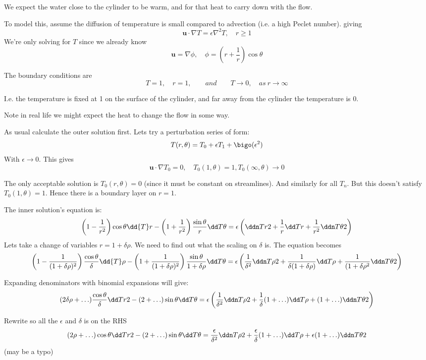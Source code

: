 \documentclass{X:/Documents/Coding/Latex/myassignment}
\begin{document}
We expect the water close to the cylinder to be warm, and for that heat to carry down with the flow.

To model this, assume the diffusion of temperature is small compared to advection (i.e. a high Peclet number). giving
\[\mathbf{u}\cdot \nabla T = \epsilon \nabla^2 T, \quad r \geq 1\]
We're only solving for $T$ since we already know
\[\mathbf{u} = \nabla\phi,\quad \phi = \left(r + \frac1r\right)\cos\theta\]

The boundary conditions are 
\[T=1,\quad r=1, \qquad and \qquad T\to 0,\quad as \ r\to \infty\]

I.e. the temperature is fixed at 1 on the surface of the cylinder, and far away from the cylinder the temperature is $0$.

Note in real life we might expect the heat to change the flow in some way.


As usual calculate the outer solution first.
Lets try a perturbation series of form:
\[T(r,\theta) = T_0 + \epsilon T_1 + \bigo(\epsilon^2)\]
With $\epsilon\to 0$. This gives
\[\mathbf{u} \cdot \nabla T_0 = 0 ,\quad T_0(1,\theta) = 1, T_0(\infty,\theta) \to 0\]

The only acceptable solution is $T_0(r,\theta) =0$ (since it must be constant on streamlines). And similarly for all $T_n$. But this doesn't satisfy $T_0(1,\theta)=1$. Hence there is a boundary layer on $r=1$.

The inner solution's equation is:
\[\left(1-\frac1{r^2}\right)\cos\theta \dd{T}r - \left(1 + \frac1{r^2}\right)\frac{\sin \theta}r \dd T\theta  = \epsilon\left(\ddn Tr2 + \frac1r \dd Tr + \frac1{r^2} \ddn T\theta 2\right)\]
Lets take a change of variables $r = 1 + \delta \rho$. We need to find out what the scaling on $\delta$ is.
The equation becomes
\begin{align*}
    \left(1-\frac1{(1 + \delta \rho)^2}\right)\frac{\cos\theta}\delta  \dd{T}\rho - \left(1 + \frac1{(1 + \delta \rho)^2}\right)\frac{\sin \theta}{1+\delta \rho} \dd T\theta  = \epsilon\left(\frac{1}{\delta^2}\ddn T\rho2 + \frac1{\delta(1+\delta \rho)} \dd T\rho + \frac1{(1+\delta \rho^2} \ddn T\theta 2\right)
\end{align*}

Expanding denominators with binomial expansions will give:
\[(2 \delta \rho + \hdots) \frac{\cos\theta}{\delta} \dd Tr2 - (2 +\hdots) \sin \theta \dd T \theta = \epsilon\left(\frac{1}{\delta^2}\ddn T\rho2 + \frac1{\delta}(1+\hdots) \dd T\rho + (1+\hdots) \ddn T\theta 2\right)\]

Rewrite so all the $\epsilon$ and $\delta$ is on the RHS
\[(2 \rho + \hdots) \cos\theta \dd Tr2 - (2 +\hdots) \sin \theta \dd T \theta = \frac{\epsilon}{\delta^2}\ddn T\rho2 + \frac\epsilon{\delta}(1+\hdots) \dd T\rho + \epsilon(1+\hdots) \ddn T\theta 2\]
(may be a typo)
\end{document}
